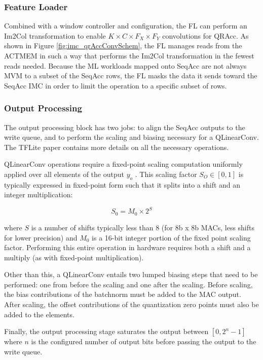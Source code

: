 \subsubsection{Feature Loader}

Combined with a window controller and configuration, the FL can perform an Im2Col transformation to enable $K\times C\times F_X\times F_Y$ convolutions for QRAcc. As shown in Figure \ref{fig:imc_qrAccConvSchem}, the FL manages reads from the ACTMEM in such a way that performs the Im2Col transformation in the fewest reads needed. Because the ML workloads mapped onto SeqAcc are not always MVM to a subset of the SeqAcc rows, the FL masks the data it sends toward the SeqAcc IMC in order to limit the operation to a specific subset of rows. 

\subsubsection{Output Processing}

The output processing block has two jobs: to align the SeqAcc outputs to the write queue, and to perform the scaling and biasing necessary for a QLinearConv. The TFLite paper \cite{jacob2018quantization} contains more details on all the necessary operations.

QLinearConv operations require a fixed-point scaling computation uniformly applied over all elements of the output $y_o$ \cite{jacob2018quantization}. This scaling factor $S_O\in[0,1]$ is typically expressed in fixed-point form such that it splits into a shift and an integer multiplication:

\begin{equation}
    S_0=M_0\times2^S
\end{equation}

where $S$ is a number of shifts typically less than 8 (for 8b x 8b MACs, less shifts for lower precision) and $M_0$ is a 16-bit integer portion of the fixed point scaling factor. Performing this entire operation in hardware requires both a shift and a multiply (as with fixed-point multiplication).

Other than this, a QLinearConv entails two lumped biasing steps that need to be performed: one from before the scaling and one after the scaling. Before scaling, the bias contributions of the batchnorm must be added to the MAC output. After scaling, the offset contributions of the quantization zero points must also be added to the elements.

Finally, the output processing stage saturates the output between $[0,2^n-1]$ where $n$ is the configured number of output bits before passing the output to the write queue.

